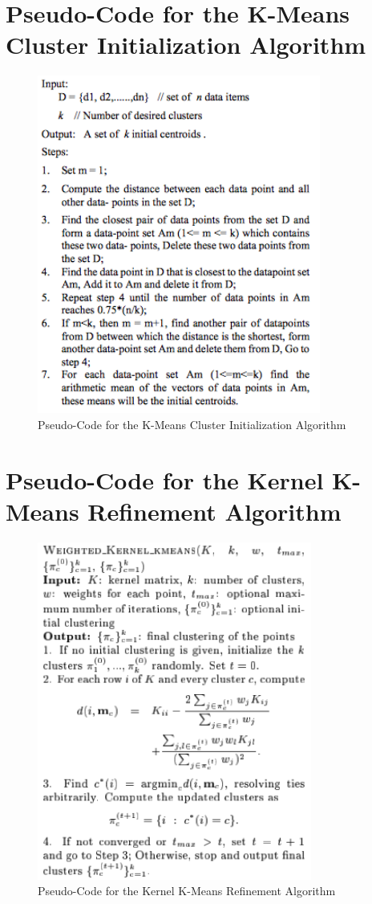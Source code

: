 \documentclass[12pt]{article}
\begin{document}
\section{Pseudo-Code for the K-Means Cluster Initialization Algorithm}
\label{appendix:kmeansinit}
\begin{figure}[!htb]
\begin{center}
	\includegraphics[height=30em]{kmeans_init.png}
	\caption{Pseudo-Code for the K-Means Cluster Initialization Algorithm}
\end{center}
\end{figure}

\newpage
\section{Pseudo-Code for the Kernel K-Means Refinement Algorithm}
\label{appendix:kernel_kmeans}
\begin{figure}[!htb]
\begin{center}
	\includegraphics[height=30em]{kernel_kmeans.png}
	\caption{Pseudo-Code for the Kernel K-Means Refinement Algorithm}
\end{center}
\end{figure}
\end{document}
